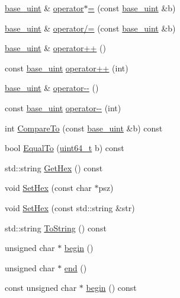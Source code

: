 \begin{DoxyCompactItemize}
\item 
\hyperlink{classbase__uint}{base\+\_\+uint} \& \hyperlink{classbase__uint_a806b2ba843181e9dd4c824414fbcc13d}{operator$\ast$=} (const \hyperlink{classbase__uint}{base\+\_\+uint} \&b)
\item 
\hyperlink{classbase__uint}{base\+\_\+uint} \& \hyperlink{classbase__uint_ad6fa7e22ab995247c0bf298069732e1d}{operator/=} (const \hyperlink{classbase__uint}{base\+\_\+uint} \&b)
\item 
\hyperlink{classbase__uint}{base\+\_\+uint} \& \hyperlink{classbase__uint_a56b54869886808961092d3f764fadd9f}{operator++} ()
\item 
const \hyperlink{classbase__uint}{base\+\_\+uint} \hyperlink{classbase__uint_a2d5a123c856b2b31fae5f65891832486}{operator++} (int)
\item 
\hyperlink{classbase__uint}{base\+\_\+uint} \& \hyperlink{classbase__uint_a2cc581d32afac619acd12601ddea4180}{operator-\/-\/} ()
\item 
const \hyperlink{classbase__uint}{base\+\_\+uint} \hyperlink{classbase__uint_a78a8e46c434c0e61be86282fe9543587}{operator-\/-\/} (int)
\item 
int \hyperlink{classbase__uint_ac9777c80cfcf1355cf17258027ca35bb}{Compare\+To} (const \hyperlink{classbase__uint}{base\+\_\+uint} \&b) const 
\item 
bool \hyperlink{classbase__uint_a39817436d7ba143e8d52abc475097384}{Equal\+To} (\hyperlink{stdint_8h_aaa5d1cd013383c889537491c3cfd9aad}{uint64\+\_\+t} b) const 
\item 
std\+::string \hyperlink{classbase__uint_ac9929c28600796a9acf75881bb750576}{Get\+Hex} () const 
\item 
void \hyperlink{classbase__uint_ade1a897fac931f28f54998c92c797228}{Set\+Hex} (const char $\ast$psz)
\item 
void \hyperlink{classbase__uint_afe3600e6ae4e9f69e1c036581a2716c8}{Set\+Hex} (const std\+::string \&str)
\item 
std\+::string \hyperlink{classbase__uint_ac3080a72402cadf28dbc9f9b69cc60be}{To\+String} () const 
\item 
unsigned char $\ast$ \hyperlink{classbase__uint_aaa32054bf4e8fbb31d54a75f6065174d}{begin} ()
\item 
unsigned char $\ast$ \hyperlink{classbase__uint_a76539ef6be800bc02e4038f457a4f74a}{end} ()
\item 
const unsigned char $\ast$ \hyperlink{classbase__uint_ae2049504988d5024ccfe71fb52b2009a}{begin} () const 
\item 

\end{DoxyCompactItemize}
